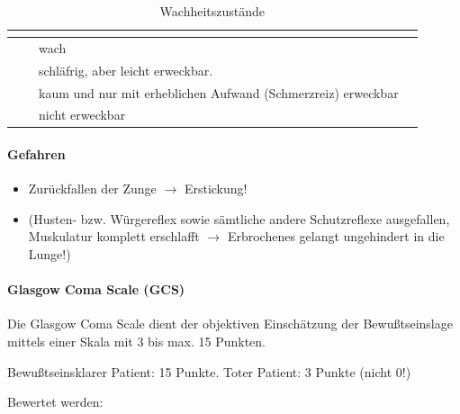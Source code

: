 \begin{table}[H]\begin{center}
\begin{tabulary}{\linewidth}{LLLL}
\toprule
{} 
\\\midrule
{}
 &
 &
 wach
 &
\\\addlinespace
{}
&
 
 &
schläfrig, aber leicht erweckbar.
 &
\\
 &
 
 &
 kaum und nur mit erheblichen Aufwand (Schmerzreiz)
 erweckbar 
 &
\\\addlinespace
{}
 &
 &
 nicht erweckbar
 &
\\\bottomrule
\end{tabulary}
\caption{Wachheitszustände}
\end{center}
\end{table}


\paragraph{Gefahren}

\begin{itemize}
    \item Zurückfallen der Zunge ${\rightarrow}$ Erstickung!
    
    \item {}  (Husten- bzw.
    Würgereflex sowie sämtliche andere Schutzreflexe
     ausgefallen,  Muskulatur
    komplett erschlafft ${\rightarrow}$  Erbrochenes gelangt ungehindert in die  Lunge!)
    
\end{itemize}

\paragraph{Glasgow Coma Scale (GCS)}\label{topic:gcs}

Die Glasgow Coma Scale dient der objektiven Einschätzung
der Bewußtseinslage mittels einer Skala mit 3 bis max.
15 Punkten.

Bewußtseinsklarer Patient: 15 Punkte. Toter Patient: 3 Punkte (nicht
0!)

Bewertet werden: 


